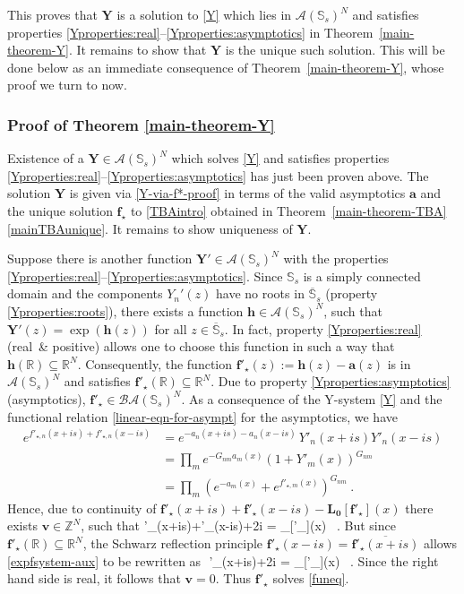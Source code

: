 \documentclass[12pt]{article}
\theoremstyle{plain}
\theoremstyle{definition}
\numberwithin{equation}{section}
\numberwithin{theorem}{section}
\def\be#1\ee{\begin{equation}#1\end{equation}}
\renewcommand{\vec}[1]{\mathbf{#1}}
\begin{document}
This proves that $\vec Y$ is a solution to \eqref{Y} which lies in $\mathcal{A}(\mathbb{S}_s)^N$ and satisfies properties \ref{Yproperties:real}--\ref{Yproperties:asymptotics} in Theorem~\ref{main-theorem-Y}. It remains to show that $\vec Y$ is the unique such solution.
This will be done below as an immediate consequence of Theorem~\ref{main-theorem-Y}, whose proof we turn to now.

\subsubsection*{Proof of Theorem \ref{main-theorem-Y}}

Existence of a $\vec Y \in \mathcal{A}(\mathbb{S}_s)^N$ which solves  \eqref{Y} and satisfies properties \ref{Yproperties:real}--\ref{Yproperties:asymptotics} has just been proven above. The solution $\vec Y$ is given via \eqref{Y-via-f*-proof} in terms of the valid asymptotics $\vec a$ and the unique solution $\vec f_\star$ to \eqref{TBAintro} obtained in Theorem~\ref{main-theorem-TBA}\,\ref{mainTBAunique}.
It remains to show uniqueness of $\vec Y$.

Suppose there is another function $\vec{Y}'\in\mathcal{A}(\mathbb{S}_s)^N$ with the properties \ref{Yproperties:real}--\ref{Yproperties:asymptotics}. Since $\mathbb{S}_s$ is a simply connected domain and the components $Y_{n}'(z)$ 
have no roots in $\overline{\mathbb{S}}_s$ (property \ref{Yproperties:roots}), there exists a function $\vec{h}\in\mathcal{A}(\mathbb{S}_s)^N$, such that $\vec{Y}'(z)=\exp(\vec{h}(z))$ for all $z\in\overline{\mathbb{S}}_s$. 
In fact, property \ref{Yproperties:real} (real\ \& positive) allows one to choose this function in such a way that $\vec{h}(\mathbb{R})\subseteq\mathbb{R}^N$. 
Consequently, the function $\vec{f}'_\star(z):=\vec{h}(z)-\vec{a}(z)$ is in $\mathcal{A}(\mathbb{S}_s)^N$ and satisfies $\vec{f}'_\star(\mathbb{R})\subseteq\mathbb{R}^N$. 
Due to property \ref{Yproperties:asymptotics} (asymptotics),
$\vec{f}'_\star\in\mathcal{BA}(\mathbb{S}_s)^N$. 
As a consequence of the Y-system \eqref{Y} and the functional relation \eqref{linear-eqn-for-asympt} for the asymptotics, we have
\begin{align}
e^{f'_{\star,n}(x+is)+f'_{\star,n}(x-is)} &= e^{-a_n(x+is)-a_n(x-is)}\,Y'_n(x+is)Y'_n(x-is) \nonumber \\
&= \prod_m e^{-G_{nm}a_m(x)} \left(1 + Y'_m(x) \right)^{G_{nm}} \nonumber \\
&=\prod_m  \left(e^{-a_m(x)} + e^{f'_{\star,m}(x)} \right)^{G_{nm}} \ .
\end{align}
Hence, due to continuity of $\vec{f}'_\star(x+is)+\vec{f}'_\star(x-is)- \vec{L}_{\vec 0}[\vec{f}'_\star](x)$
there exists $\vec{v}\in\mathbb{Z}^N$, such that
\be\label{expfsystem-aux}
\vec{f}'_\star(x+is)+\vec{f}'_\star(x-is)+2\pi i \vec{v} = \vec{L}_{\vec 0}[\vec{f}'_\star](x) \ .
\ee
But since $\vec{f}'_\star(\mathbb{R})\subseteq\mathbb{R}^N$, the Schwarz reflection principle $\vec{f}'_\star(x-is) = \overline{\vec{f}'_\star(x+is) }$ allows \eqref{expfsystem-aux} to be rewritten as
\be 
	2\,\,\vec{f}'_\star(x+is)+2\pi i \vec{v} = \vec{L}_{\vec 0}[\vec{f}'_\star](x) \ .
\ee
Since the right hand side is real, it follows that $\vec{v}=0$. Thus $\vec{f}'_\star$ solves \eqref{funeq}. 
\end{document}
